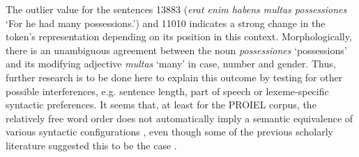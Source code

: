 \documentclass[runningheads]{llncs}
\begin{document}
The outlier value for the sentences 13883 (\textit{erat enim habens multas possessiones} `For he had many possessions.') and 11010 indicates a strong change in the token's representation depending on its position in this context. Morphologically, there is an unambiguous agreement between the noun \textit{possessiones} `possessions' and its modifying adjective \textit{multas} `many' in case, number and gender. Thus, further research is to be done here to explain this outcome by testing for other possible interferences, e.g. sentence length, part of speech or lexeme-specific syntactic preferences. It seems that, at least for the PROIEL corpus, the relatively free word order does not automatically imply a semantic equivalence of various syntactic configurations \parencite[452]{devineLatinWordOrder2006}, even though some of the previous scholarly literature suggested this to be the case \parencite[421]{niemeyerZurStellungAttributiven1997}. 
\end{document}
